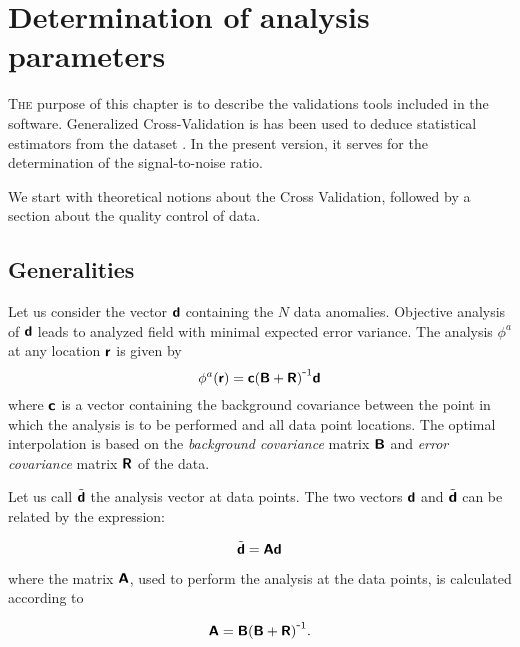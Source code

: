 \chapter[Determination of analysis parameters]{Determination of analysis parameters \label{chap:analysisparameters}}

\lettrine[lines=2, loversize=-0.1, lraise=0.1]{T}{he} purpose of this chapter is to describe the validations tools included in the \diva software.  Generalized Cross-Validation is has been used to deduce statistical estimators from the dataset \citep{BRANKART96}. In the present version, it serves for the determination of the signal-to-noise ratio.

We start with theoretical notions about the Cross Validation, followed by a section about the quality control of data. 

\minitoc


\section{Generalities}

Let us consider the vector $\mbox{\boldmath $ \protect\mathsf{d} $}$ containing the $N$ data anomalies. Objective analysis of $\mbox{\boldmath $ \protect\mathsf{d} $}$ leads to analyzed field with minimal expected error variance. The analysis $\phi^a$ at any location $\mbox{\boldmath $ \protect\mathsf{r} $}$ is given by
\begin{equation}
\phi^a(\mbox{\boldmath $ \protect\mathsf{r} $}) = \mbox{\boldmath $ \protect\mathsf{c} $} {( \mbox{\boldmath $ \protect\mathsf{B} $} + \mbox{\boldmath $ \protect\mathsf{R} $} )}^{ \mbox{\small{-}} 1} \mbox{\boldmath $ \protect\mathsf{d} $}
\end{equation}
where $\mbox{\boldmath $ \protect\mathsf{c} $}$ is a vector containing the background covariance between the point in which the analysis is to be performed and all data point locations. The optimal interpolation is based on the \textit{background covariance} matrix $\mbox{\boldmath $ \protect\mathsf{B} $}$ and \textit{error covariance} matrix $\mbox{\boldmath $ \protect\mathsf{R} $}$ of the data.
 
Let us call $\tilde{\mbox{\boldmath $ \protect\mathsf{d} $}}$ the analysis vector at data points. The two vectors ${\mbox{\boldmath $ \protect\mathsf{d} $}}$ and $\tilde{\mbox{\boldmath $ \protect\mathsf{d} $}}$ can be related by the expression:

\begin{equation}
\tilde{\mbox{\boldmath $ \protect\mathsf{d} $}}  =  \mbox{\boldmath $ \protect\mathsf{A} $} \mbox{\boldmath $ \protect\mathsf{d} $}
\end{equation}

where the matrix $\mbox{\boldmath $ \protect\mathsf{A} $}$, used to perform the analysis at the data points, is calculated according to 

\begin{equation}
\mbox{\boldmath $ \protect\mathsf{A} $}=\mbox{\boldmath $ \protect\mathsf{B} $} {( \mbox{\boldmath $ \protect\mathsf{B} $} + \mbox{\boldmath $ \protect\mathsf{R} $} )}^{ \mbox{\small{-}} 1}.
\end{equation}


